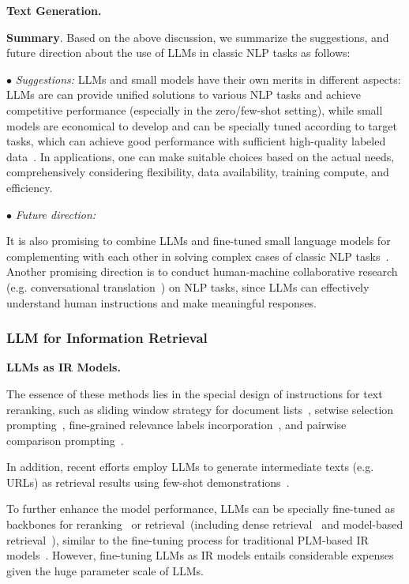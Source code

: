{{\textbf{Text Generation.}

\textbf{Summary}. 
{Based on the above discussion, we summarize the suggestions, and future direction about the use of LLMs in classic NLP tasks as follows:}

$\bullet$ \emph{Suggestions:}
LLMs and small models have their own merits in different aspects: LLMs are can provide unified solutions to various NLP tasks and achieve competitive performance (especially in the zero/few-shot setting), while small models are economical to develop and can be specially tuned according to target tasks, which can achieve good performance with sufficient high-quality labeled data~\cite{Qin-arxiv-2023-Is,Chen-arxiv-2023-Robust,Kocon-arxiv-2023-ChatGPT,Zhong-arxiv-2023-Can}. In applications, one can make suitable choices based on the actual needs, comprehensively considering flexibility, data availability, training compute, and efficiency.

$\bullet$ \emph{Future direction:} 

It is also promising to combine LLMs and fine-tuned small language models for complementing with each other in solving complex cases of classic NLP tasks~\cite{Cheng-arxiv-2023-UPRISE}. Another promising direction is to conduct human-machine collaborative research (e.g. conversational translation~\cite{jiao-arxiv-2023-parrot}) on NLP tasks, since LLMs can effectively understand human instructions and make meaningful responses. 

}

\subsubsection{LLM for Information Retrieval}

\textbf{LLMs as IR Models.}

{The essence of these methods lies in the special design of  instructions for text reranking, such as sliding window strategy for document lists~\cite{sun-arxiv-2023-chatgpt, ma-arxiv-2023-zero}, setwise selection prompting~\cite{zhuang-arxiv-2023-setwise}, fine-grained relevance labels incorporation~\cite{zhuang-arxiv-2023-beyond}, and pairwise comparison prompting~\cite{qin-arxiv-2023-large}.}

In addition, recent efforts employ LLMs to generate intermediate texts (e.g. URLs) as retrieval results using few-shot demonstrations~\cite{ziems-arxiv-2023-large}.

To further enhance the model performance, LLMs can be specially fine-tuned as  backbones for reranking~\cite{Ma-arxiv-2023-fine, pradeep-arxiv-2023-rankvicuna} or retrieval~(including dense retrieval~\cite{Zhao-arxiv-2022-Dense} and model-based retrieval~\cite{Tay-NIPS-2022-transformer, Ren-ACL-2023-tome}), similar to the fine-tuning process for traditional PLM-based IR models~\cite{Ma-arxiv-2023-fine}. However, fine-tuning LLMs as IR models entails considerable expenses given the huge parameter scale of LLMs. }

